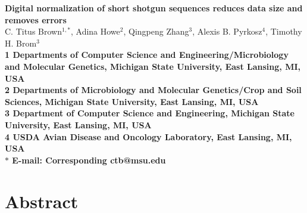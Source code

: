 \documentclass[10pt,draft]{article}
\date{}
\begin{document}
\begin{flushleft}
{\Large
\textbf{Digital normalization of short shotgun sequences reduces data size
and removes errors}
}
\\
C. Titus Brown$^{1,\ast}$, 
Adina Howe$^{2}$,
Qingpeng Zhang$^{3}$,
Alexis B. Pyrkosz$^{4}$,
Timothy H. Brom$^{3}$
\\
\bf{1} Departments of Computer Science and Engineering/Microbiology and Molecular Genetics, Michigan State University, East Lansing, MI, USA
\\
\bf{2} Departments of Microbiology and Molecular Genetics/Crop and Soil Sciences, Michigan State University, East Lansing, MI, USA
\\
\bf{3} Department of Computer Science and Engineering, Michigan State University, East Lansing, MI, USA
\\
{\bf{4} USDA Avian Disease and Oncology Laboratory, East Lansing, MI, USA}
\\
$\ast$ E-mail: Corresponding ctb@msu.edu
\end{flushleft}

\section*{Abstract}
\end{document}
